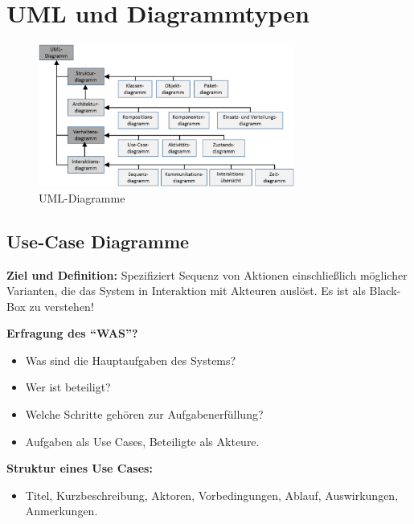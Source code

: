 \documentclass[11pt, a4paper]{article}
\begin{document}
\vspace{5em}

\section{UML und Diagrammtypen}


\begin{figure}[h]
    \centering
    \includegraphics[width=0.75\textwidth]{UML-00.png}
    \caption{UML-Diagramme}
    \label{fig:UML-00}
\end{figure}


\newpage


\subsection{Use-Case Diagramme}


\noindent \textbf{Ziel und Definition:} Spezifiziert Sequenz von Aktionen einschließlich möglicher Varianten, die das System in Interaktion mit Akteuren auslöst. Es ist als Black-Box zu verstehen!

\vspace{1em}

\noindent\textbf{Erfragung des “WAS”?}
\begin{itemize}
    \item Was sind die Hauptaufgaben des Systems?
    \item Wer ist beteiligt?
    \item Welche Schritte gehören zur Aufgabenerfüllung?
    \item Aufgaben als Use Cases, Beteiligte als Akteure.
\end{itemize}

\vspace{1em}

\noindent\textbf{Struktur eines Use Cases:}
\begin{itemize}
    \item Titel, Kurzbeschreibung, Aktoren, Vorbedingungen, Ablauf, Auswirkungen, Anmerkungen.
\end{itemize}
\end{document}
